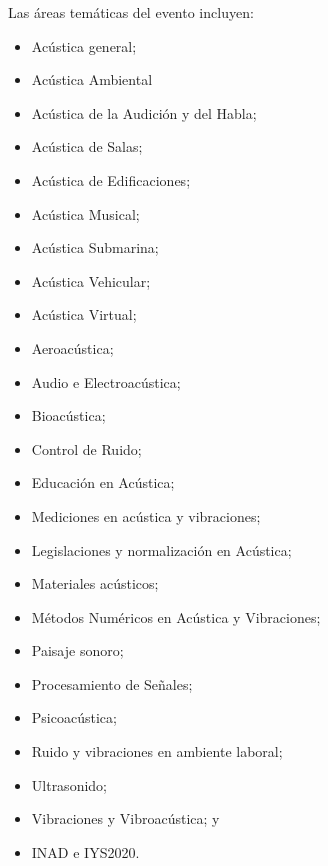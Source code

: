 \documentclass[12pt, a4paper, twoside, twocolumn]{article}
\begin{document}
\vspace{5pt}

Las áreas temáticas del evento incluyen:
%	
\begin{itemize}[noitemsep,topsep=-1ex] \itemsep=1.0pt
\item[\textbullet]Acústica general; 
\item[\textbullet]Acústica Ambiental
\item[\textbullet]Acústica de la Audición y del Habla;
\item[\textbullet]Acústica de Salas;
\item[\textbullet]Acústica de Edificaciones;
\item[\textbullet]Acústica Musical;
\item[\textbullet]Acústica Submarina;
\item[\textbullet]Acústica Vehicular;
\item[\textbullet]Acústica Virtual;
\item[\textbullet]Aeroacústica;
\item[\textbullet]Audio e Electroacústica;
\item[\textbullet]Bioacústica;
\item[\textbullet]Control de Ruido;
\item[\textbullet]Educación en Acústica;
\item[\textbullet]Mediciones en acústica y vibraciones;
\item[\textbullet]Legislaciones y normalización en Acústica;
\item[\textbullet]Materiales acústicos;
\item[\textbullet]Métodos Numéricos en Acústica y Vibraciones;
\item[\textbullet]Paisaje sonoro;
\item[\textbullet]Procesamiento de Señales;
\item[\textbullet]Psicoacústica;
\item[\textbullet]Ruido y vibraciones en ambiente laboral;
\item[\textbullet]Ultrasonido; 
\item[\textbullet]Vibraciones y Vibroacústica; y
\item[\textbullet]INAD e IYS2020.
	\end{itemize}
	

\end{document}
